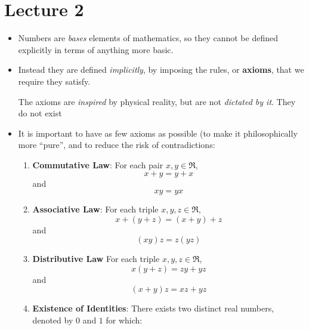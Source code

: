 \section{Lecture 2}
\begin{itemize}
    \item Numbers are \textit{bases} elements of mathematics, so they cannot be defined explicitly in terms of anything more basic. \item Instead they are defined \textit{implicitly}, by imposing the rules, or \textbf{axioms}, that we require they satisfy.
    \begin{idea}
        The axioms are \textit{inspired} by physical reality, but are not \textit{dictated by it}. They do not exist
    \end{idea}
    \item It is important to have as few axioms as possible (to make it philosophically more ``pure'', and to reduce the risk of contradictions:
    \begin{enumerate}
        \item \textbf{Commutative Law}: For each pair $x,y\in \Re$,
        \begin{equation}
            x+y=y+x
            \label{eq:}
        \end{equation}
        and
        \begin{equation}
            xy=yx
            \label{eq:}
        \end{equation}
        \item \textbf{Associative Law}: For each triple $x,y,z \in\Re$,
        \begin{equation}
            x+(y+z)=(x+y)+z
            \label{eq:}
        \end{equation}
        and
        \begin{equation}
            (xy)z=z(yz)
            \label{eq:}
        \end{equation}
        \item \textbf{Distributive Law} For each triple $x,y,z \in \Re$,
        \begin{equation}
            x(y+z)=zy+yz
            \label{eq:}
        \end{equation}
        and
        \begin{equation}
            (x+y)z=xz+yz
            \label{eq:}
        \end{equation}
        \item \textbf{Existence of Identities}: There exists two distinct real numbers, denoted by $0$ and $1$ for which:

\end{enumerate}
\end{itemize}

